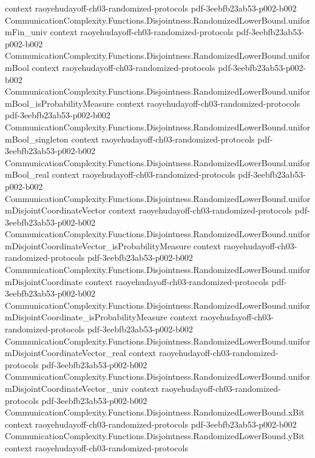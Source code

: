 \begin{theorem}
  {context}
  {raoyehudayoff-ch03-randomized-protocols}
  {pdf-3eebfb23ab53-p002-b002}
\proofstep
  {CommunicationComplexity.Functions.Disjointness.RandomizedLowerBound.uniformFin_univ}
  {context}
  {raoyehudayoff-ch03-randomized-protocols}
  {pdf-3eebfb23ab53-p002-b002}
\proofstep
  {CommunicationComplexity.Functions.Disjointness.RandomizedLowerBound.uniformBool}
  {context}
  {raoyehudayoff-ch03-randomized-protocols}
  {pdf-3eebfb23ab53-p002-b002}
\proofstep
  {CommunicationComplexity.Functions.Disjointness.RandomizedLowerBound.uniformBool_isProbabilityMeasure}
  {context}
  {raoyehudayoff-ch03-randomized-protocols}
  {pdf-3eebfb23ab53-p002-b002}
\proofstep
  {CommunicationComplexity.Functions.Disjointness.RandomizedLowerBound.uniformBool_singleton}
  {context}
  {raoyehudayoff-ch03-randomized-protocols}
  {pdf-3eebfb23ab53-p002-b002}
\proofstep
  {CommunicationComplexity.Functions.Disjointness.RandomizedLowerBound.uniformBool_real}
  {context}
  {raoyehudayoff-ch03-randomized-protocols}
  {pdf-3eebfb23ab53-p002-b002}
\proofstep
  {CommunicationComplexity.Functions.Disjointness.RandomizedLowerBound.uniformDisjointCoordinateVector}
  {context}
  {raoyehudayoff-ch03-randomized-protocols}
  {pdf-3eebfb23ab53-p002-b002}
\proofstep
  {CommunicationComplexity.Functions.Disjointness.RandomizedLowerBound.uniformDisjointCoordinateVector_isProbabilityMeasure}
  {context}
  {raoyehudayoff-ch03-randomized-protocols}
  {pdf-3eebfb23ab53-p002-b002}
\proofstep
  {CommunicationComplexity.Functions.Disjointness.RandomizedLowerBound.uniformDisjointCoordinate}
  {context}
  {raoyehudayoff-ch03-randomized-protocols}
  {pdf-3eebfb23ab53-p002-b002}
\proofstep
  {CommunicationComplexity.Functions.Disjointness.RandomizedLowerBound.uniformDisjointCoordinate_isProbabilityMeasure}
  {context}
  {raoyehudayoff-ch03-randomized-protocols}
  {pdf-3eebfb23ab53-p002-b002}
\proofstep
  {CommunicationComplexity.Functions.Disjointness.RandomizedLowerBound.uniformDisjointCoordinateVector_real}
  {context}
  {raoyehudayoff-ch03-randomized-protocols}
  {pdf-3eebfb23ab53-p002-b002}
\proofstep
  {CommunicationComplexity.Functions.Disjointness.RandomizedLowerBound.uniformDisjointCoordinateVector_univ}
  {context}
  {raoyehudayoff-ch03-randomized-protocols}
  {pdf-3eebfb23ab53-p002-b002}
\proofstep
  {CommunicationComplexity.Functions.Disjointness.RandomizedLowerBound.xBit}
  {context}
  {raoyehudayoff-ch03-randomized-protocols}
  {pdf-3eebfb23ab53-p002-b002}
\proofstep
  {CommunicationComplexity.Functions.Disjointness.RandomizedLowerBound.yBit}
  {context}
  {raoyehudayoff-ch03-randomized-protocols}

\end{theorem}
